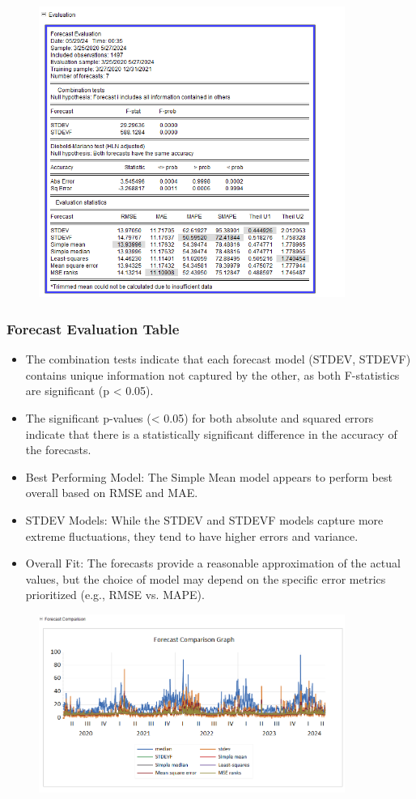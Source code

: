 \documentclass{article} %
\begin{document}
\begin{figure}[H]
    \centering
    \includegraphics[width=10cm]{images/image38.png}
\end{figure}

\subsubsection*{Forecast Evaluation Table}
\begin{itemize}
    \item The combination tests indicate that each forecast model (STDEV, STDEVF) contains unique information not captured by the other, as both F-statistics are significant (p < 0.05).
    \item The significant p-values (< 0.05) for both absolute and squared errors indicate that there is a statistically significant difference in the accuracy of the forecasts.
    \item Best Performing Model: The Simple Mean model appears to perform best overall based on RMSE and MAE.
    \item STDEV Models: While the STDEV and STDEVF models capture more extreme fluctuations, they tend to have higher errors and variance.
    \item Overall Fit: The forecasts provide a reasonable approximation of the actual values, but the choice of model may depend on the specific error metrics prioritized (e.g., RMSE vs. MAPE).
\end{itemize}

\begin{figure}[H]
    \centering
    \includegraphics[width=10cm]{images/image19.png}
\end{figure}
\end{document}
